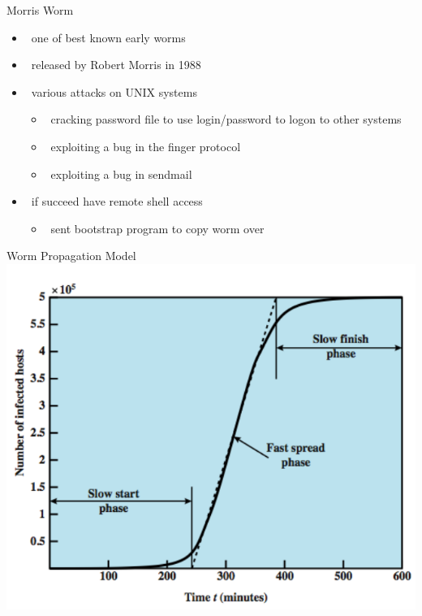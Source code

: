 \documentclass{beamer}
\begin{document}
\begin{frame}{Morris Worm}
  \begin{itemize}
  \item  one of best known early worms 
  \item  released by Robert Morris in 1988 
  \item  various attacks on UNIX systems 
    \begin{itemize}
    \item  cracking password file to use login/password to 
      logon to other systems 
    \item  exploiting a bug in the finger protocol 
    \item  exploiting a bug in sendmail 
    \end{itemize}
  \item  if succeed have remote shell access 
    \begin{itemize}
    \item  sent bootstrap program to copy worm over
    \end{itemize}
  \end{itemize}
\end{frame}

\begin{frame}{Worm Propagation Model}
\includegraphics[width=0.8\linewidth]{wormPropagation}
\end{frame}
\end{document}
